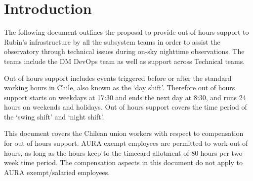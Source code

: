 \section{Introduction}

The following document outlines the proposal to provide out of hours support to Rubin's infrastructure by all the subsystem teams in order to assist the observatory through technical issues during on-sky nighttime observations.  The teams include the DM DevOps team as well as support across Technical teams.

Out of hours support includes events triggered before or after the standard working hours in Chile, also known as the `day shift'. Therefore out of hours support starts on weekdays at 17:30 and ends the next day at 8:30, and runs 24 hours on weekends and holidays.  Out of hours support covers the time period of the `swing shift' and `night shift'.

This document covers the Chilean union workers with respect to compensation for out of hours support.  AURA exempt employees are permitted to work out of hours, as long as the hours keep to the timecard allotment of 80 hours per two-week time period.  The compensation aspects in this document do not apply to AURA exempt/salaried employees.